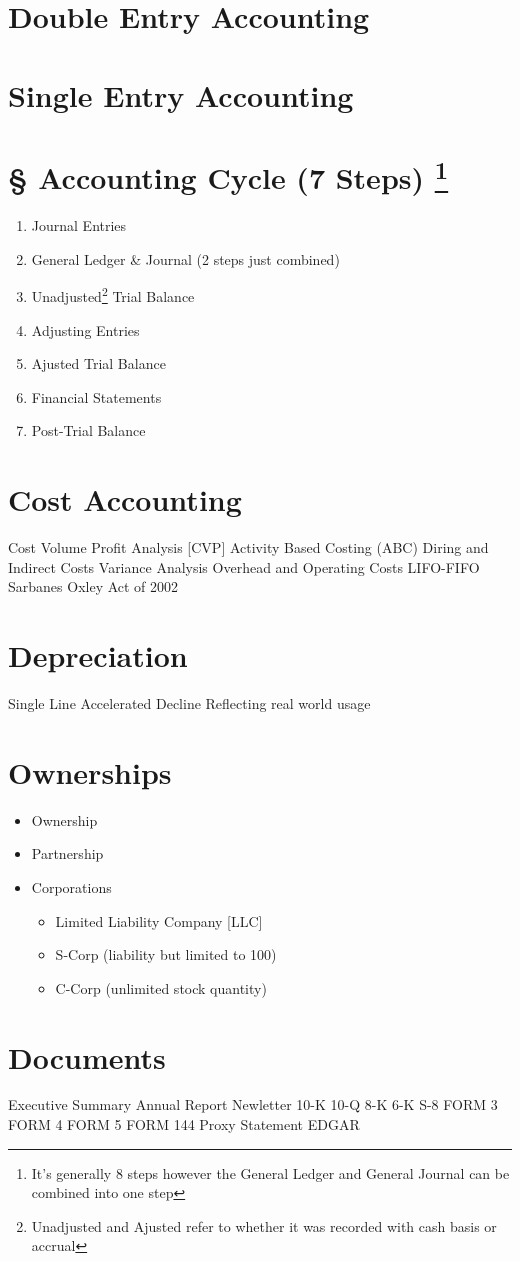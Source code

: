 \section{Double Entry Accounting}

\section{Single Entry Accounting }

\section{§ Accounting Cycle (7 Steps) \protect\footnote{It's generally 8 steps however the General Ledger and General Journal can be combined into one step} }
\begin{enumerate}
    \item Journal Entries
    \item General Ledger \& Journal (2 steps just combined) 
    \item Unadjusted\footnote{ Unadjusted and Ajusted refer to whether it was recorded with cash basis or accrual}  Trial Balance
    \item Adjusting Entries
    \item Ajusted Trial Balance
    \item Financial Statements
    \item Post-Trial Balance
\end{enumerate}

\newpage
\section{Cost Accounting}
Cost Volume Profit Analysis [CVP]
Activity Based Costing (ABC)
Diring and Indirect Costs
Variance Analysis
Overhead and Operating Costs 
LIFO-FIFO
Sarbanes Oxley Act of 2002

\section{Depreciation}
Single Line
Accelerated Decline
Reflecting real world usage 

\section{Ownerships}
\begin{itemize}
    \item Ownership 
    \item Partnership
    \item Corporations \begin{itemize}
        \item Limited Liability Company [LLC]
        \item S-Corp (liability but limited to 100)
        \item C-Corp (unlimited stock quantity)
    \end{itemize}
\end{itemize}

\section{Documents}
Executive Summary
Annual Report
Newletter
10-K 
10-Q 
8-K  
6-K 
S-8 
FORM 3
FORM 4
FORM 5
FORM 144
Proxy Statement
EDGAR